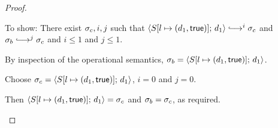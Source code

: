 \begin{proof}
\begin{itemize}
      To show: There exist $\sigma_c, i, j$ such that
      $\config{\extS{S}{l}{d_1}{\frozentrue}}{d_1} \parstepsto^i
      \conf_c$ and $\conf_b \parstepsto^j \conf_c$ and $i \leq 1$ and
      $j \leq 1$.

      By inspection of the operational semantics, $\sigma_b =
      \langle S[l \mapsto (d_1, \textsf{true})];\, d_1 \rangle$.

      Choose $\sigma_c = \langle S[l \mapsto (d_1, \textsf{true})];\, d_1 \rangle$,
      $i = 0$ and $j = 0$.

      Then $\langle S[l \mapsto (d_1, \textsf{true})];\, d_1 \rangle = \sigma_c$ and
      $\sigma_b = \sigma_c$, as required.
  \end{itemize}
\end{proof}

